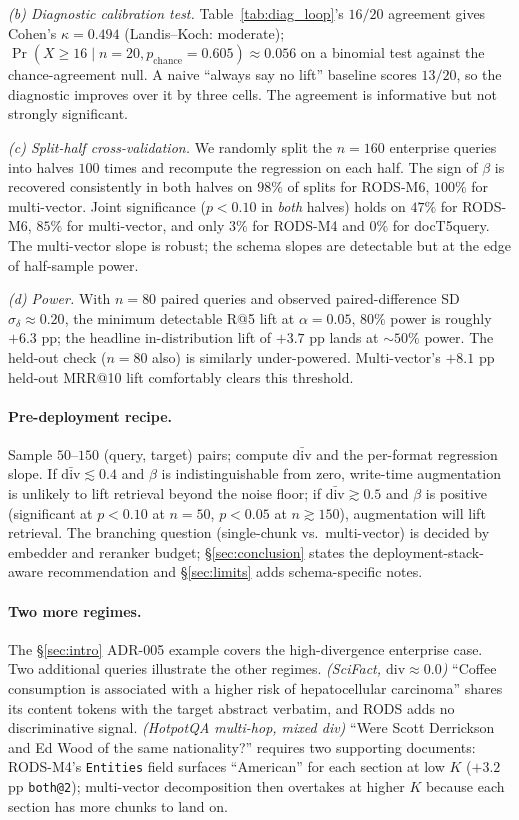 \documentclass[11pt]{article}
\begin{document}
\textit{(b) Diagnostic calibration test.} Table~\ref{tab:diag_loop}'s
$16/20$ agreement gives Cohen's $\kappa = 0.494$ (Landis--Koch:
moderate); $\Pr(X \geq 16 \mid n=20, p_{\text{chance}}=0.605)
\approx 0.056$ on a binomial test against the chance-agreement null.
A naive ``always say no lift'' baseline scores $13/20$, so the
diagnostic improves over it by three cells. The agreement is
informative but not strongly significant.

\textit{(c) Split-half cross-validation.} We randomly split the $n=160$
enterprise queries into halves $100$ times and recompute the
regression on each half. The sign of $\beta$ is recovered consistently
in both halves on $98\%$ of splits for RODS-M6, $100\%$ for
multi-vector. Joint significance ($p<0.10$ in \emph{both} halves)
holds on $47\%$ for RODS-M6, $85\%$ for multi-vector, and only
$3\%$ for RODS-M4 and $0\%$ for docT5query. The multi-vector slope
is robust; the schema slopes are detectable but at the edge of
half-sample power.

\textit{(d) Power.} With $n=80$ paired queries and observed
paired-difference SD $\sigma_{\delta} \approx 0.20$, the minimum
detectable R@5 lift at $\alpha=0.05$, $80\%$ power is roughly $+6.3$
pp; the headline in-distribution lift of $+3.7$ pp lands at
$\sim 50\%$ power. The held-out check ($n=80$ also) is similarly
under-powered. Multi-vector's $+8.1$ pp held-out MRR@10 lift comfortably
clears this threshold.

\paragraph{Pre-deployment recipe.} Sample $50$--$150$ (query, target)
pairs; compute $\bar{\mathrm{div}}$ and the per-format regression
slope. If $\bar{\mathrm{div}} \lesssim 0.4$ and $\beta$ is
indistinguishable from zero, write-time augmentation is unlikely to
lift retrieval beyond the noise floor; if
$\bar{\mathrm{div}} \gtrsim 0.5$ and $\beta$ is positive
(significant at $p<0.10$ at $n{=}50$, $p<0.05$ at $n\gtrsim 150$),
augmentation will lift retrieval. The branching question
(single-chunk vs.\ multi-vector) is decided by embedder and reranker
budget; \S\ref{sec:conclusion} states the deployment-stack-aware
recommendation and \S\ref{sec:limits} adds schema-specific notes.

\paragraph{Two more regimes.} The \S\ref{sec:intro} ADR-005 example
covers the high-divergence enterprise case. Two additional queries
illustrate the other regimes. \textit{(SciFact, $\mathrm{div}\approx
0.0$)} ``Coffee consumption is associated with a higher risk of
hepatocellular carcinoma'' shares its content tokens with the target
abstract verbatim, and RODS adds no discriminative signal.
\textit{(HotpotQA multi-hop, mixed div)} ``Were Scott Derrickson and
Ed Wood of the same nationality?'' requires two supporting documents:
RODS-M4's \texttt{Entities} field surfaces ``American'' for each
section at low $K$ ($+3.2$ pp \texttt{both@2}); multi-vector
decomposition then overtakes at higher $K$ because each section has
more chunks to land on.
\end{document}
